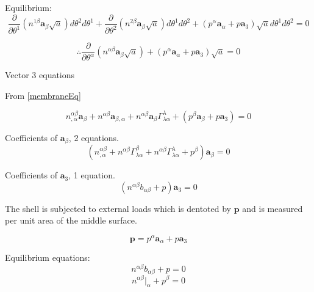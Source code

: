 Equilibrium: 
\begin{equation}
\frac{\partial}{\partial \theta^1}(n^{1 \beta}\textbf{a}_{\beta} \sqrt{a}) d\theta^2 d\theta^1 + \frac{\partial}{\partial \theta^2}(n^{2 \beta}\textbf{a}_{\beta} \sqrt{a}) d\theta^1 d\theta^2 + ( p^{\alpha}\textbf{a}_\alpha + p\textbf{a}_3)\sqrt{a} d\theta^1 d\theta^2  = 0
\end{equation}



\begin{equation} \label{membraneEq}
\therefore  \frac{\partial}{\partial \theta^ \alpha} (n^{\alpha \beta} \textbf{a}_\beta \sqrt{ a}) + ( p^{\alpha}\textbf{a}_\alpha + p\textbf{a}_3)\sqrt{a} = 0
\end{equation}

Vector 3 equations

From \ref{membraneEq}

\begin{equation}
n^{\alpha \beta}_{,\alpha} \textbf{a}_\beta + n^{\alpha \beta}\textbf{a}_{\beta,\alpha} + n^{\alpha \beta}\textbf{a}_\beta \Gamma^\lambda_{\lambda \alpha} + (p^\beta \textbf{a}_\beta + p\textbf{a}_3) = 0
\end{equation}

Coefficients of $\textbf{a}_\beta$,  2 equations.
\begin{equation}
(n^{\alpha \beta}_{,\alpha} + n^{\alpha \beta}\Gamma^\beta_{\lambda \alpha} + n^{\alpha \beta}\Gamma^\lambda_{\lambda \alpha} + p^\beta) \textbf{a}_\beta = 0 
\end{equation}

Coefficients of $\textbf{a}_3$,  1 equation.
\begin{equation}
(n^{\alpha \beta} b_{\alpha \beta} + p)\textbf{a}_3 = 0
\end{equation}

The shell is subjected to external loads which is dentoted by $\textbf{p}$ and is measured per unit area of the middle surface.

\begin{equation}
\textbf{p} = p^{\alpha}\textbf{a}_\alpha +p\textbf{a}_3
\end{equation}


Equilibrium equations:
\begin{equation}
n^{\alpha \beta}b_{\alpha \beta} + p = 0
\end{equation}
\begin{equation}
n^{\alpha \beta}|_\alpha + p^\beta = 0
\end{equation}

